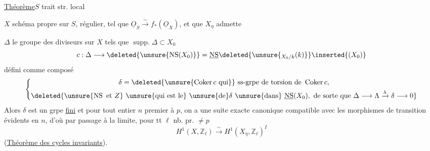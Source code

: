 

\uline{Théorème}\quad $S$ trait str. local

$X$ schéma propre sur $S$, régulier, tel que $\underline O_S\xrightarrow{\sim}f_*(\underline O_X)$, et que $X_\eta$ admette 

$\Delta$ le groupe des diviseurs sur $X$ tels que $\operatorname{supp.}\Delta\subset X_0$
\[
c:\Delta\longrightarrow\deleted{\unsure{\operatorname{NS}(X_0)}}=\underline{\operatorname{NS}}\deleted{\unsure{{}_{X_0/k}(k)}}\inserted{(X_0)}
\]
défini comme composé
\[
\left\{\begin{gathered}
\delta=\deleted{\unsure{\operatorname{Coker}c\text{ qui}}}\ \text{ss-grpe de torsion de }\operatorname{Coker}c,\\
\deleted{\unsure{\operatorname{NS}\text{ et }Z}\ \unsure{\text{qui est le}}\ \unsure{\text{de}}\delta\ \unsure{\text{dans}}\ \underline{\operatorname{NS}}(X_0),\ \text{de sorte que }\Delta\longrightarrow\Lambda\xrightarrow{\lambda}\delta\longrightarrow0}
\end{gathered}\right.
\]
 Alors $\delta$ est un grpe \uline{fini}\unsure{;|,}  et pour tout entier $n$ premier à $p$, on a une suite exacte canonique
compatible avec les morphismes de transition évidents en $n$, d'où par passage à la limite, pour tt $\ell$ nb. pr. $\neq p$
\[
H^1(X,\mathbb Z_\ell)\xrightarrow{\sim}H^1(X_{\bar\eta},\mathbb Z_\ell)^I
\]
(\uline{Théorème des cycles invariants}).

